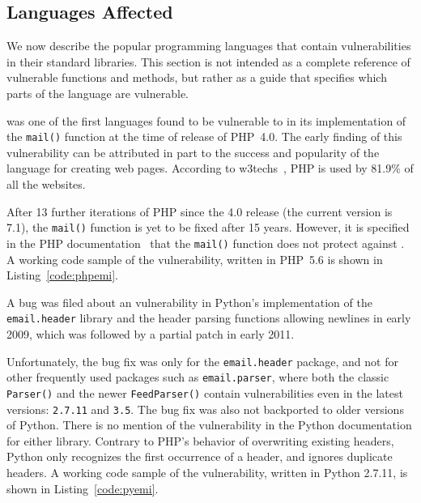 \subsection{Languages Affected}
\label{languages}
We now describe the popular programming languages that contain \ehi vulnerabilities in their standard \email libraries. This section is not intended as a complete reference of vulnerable functions and methods, but rather as a guide that specifies which parts of the language are vulnerable.

 was one of the first languages found to be vulnerable to \ehi in its implementation of the \texttt{mail()} function at the time of release of PHP~4.0. The early finding of this vulnerability can be attributed in part to the success and popularity of the language for creating web pages. According to w3techs~\cite{W3techs}, PHP is used by 81.9\% of all the websites.

After 13 further iterations of PHP since the 4.0 release (the current version is 7.1), the \texttt{mail()} function is yet to be fixed after 15 years. However, it is specified in the PHP documentation~\cite{PHPDocs} that the \texttt{mail()} function does not protect against \ehi.
A working code sample of the vulnerability, written in PHP~5.6 is shown in  Listing~\ref{code:phpemi}.

\begin{sloppypar}
A bug was filed about an \ehi vulnerability in Python's implementation of the \texttt{email.header} library and the header parsing functions allowing newlines in early 2009, which was followed by a partial patch in early 2011.
\end{sloppypar}

Unfortunately, the bug fix was only for the \texttt{email.header} package, and not for other frequently used packages such as \texttt{email.parser}, where both the classic \texttt{Parser()} and the newer \texttt{FeedParser()} contain \ehi vulnerabilities even in the latest versions: \texttt{2.7.11} and \texttt{3.5}. The bug fix was also not backported to older versions of Python.
There is no mention of the vulnerability in the Python documentation for either library. Contrary to PHP's behavior of overwriting existing headers, Python only recognizes the first occurrence of a header, and ignores duplicate headers.
A working code sample of the vulnerability, written in Python 2.7.11, is shown in Listing~\ref{code:pyemi}.



